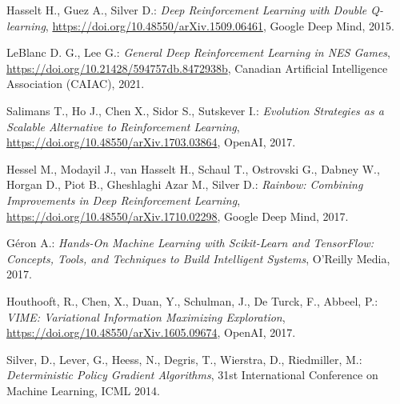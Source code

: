 \documentclass{pginz}
\begin{document}

%

\setcounter{page}{2}

%
%

\tableofcontents
{}

%
%





\begin{thebibliography}{99}

Hasselt H., Guez A., Silver D.:
\emph{Deep Reinforcement Learning with Double Q-learning}, 
\url{https://doi.org/10.48550/arXiv.1509.06461},
Google Deep Mind, 2015.

LeBlanc D. G., Lee G.:
\emph{General Deep Reinforcement Learning in NES Games}, 
\url{https://doi.org/10.21428/594757db.8472938b},
Canadian Artificial Intelligence Association (CAIAC), 2021. 

Salimans T., Ho J., Chen X., Sidor S., Sutskever I.:
\emph{Evolution Strategies as a Scalable Alternative to Reinforcement Learning}, 
\url{https://doi.org/10.48550/arXiv.1703.03864}, OpenAI, 2017.

Hessel M., Modayil J., van Hasselt H., Schaul T., Ostrovski G., Dabney W., Horgan D., Piot B., Gheshlaghi Azar M., Silver D.:
\emph{Rainbow: Combining Improvements in Deep Reinforcement Learning}, 
\url{https://doi.org/10.48550/arXiv.1710.02298},
Google Deep Mind, 2017.

Géron A.:
\emph{Hands-On Machine Learning with Scikit-Learn and TensorFlow: Concepts, Tools, and Techniques to Build Intelligent Systems}, 
O'Reilly Media, 2017.

 Houthooft, R., Chen, X., Duan, Y., Schulman, J., De Turck, F., Abbeel, P.: \emph{VIME: Variational Information Maximizing Exploration},  \url{https://doi.org/10.48550/arXiv.1605.09674}, OpenAI, 2017.

 Silver, D., Lever, G., Heess, N., Degris, T., Wierstra, D., Riedmiller, M.: \emph{Deterministic Policy Gradient Algorithms}, 31st International Conference on Machine Learning, ICML 2014.

\end{thebibliography}
\begin{appendices}
%
%
\end{appendices}
\end{document}
